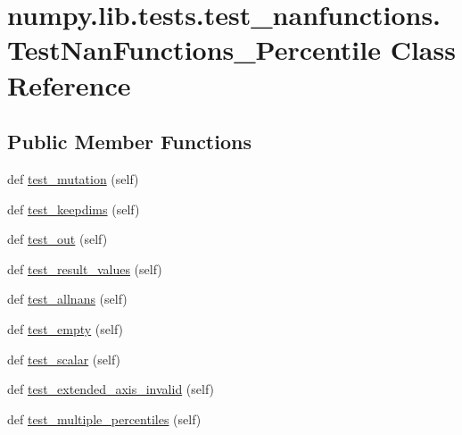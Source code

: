 \hypertarget{classnumpy_1_1lib_1_1tests_1_1test__nanfunctions_1_1TestNanFunctions__Percentile}{}\section{numpy.\+lib.\+tests.\+test\+\_\+nanfunctions.\+Test\+Nan\+Functions\+\_\+\+Percentile Class Reference}
\label{classnumpy_1_1lib_1_1tests_1_1test__nanfunctions_1_1TestNanFunctions__Percentile}
\subsection*{Public Member Functions}
\begin{DoxyCompactItemize}
\item 
def \hyperlink{classnumpy_1_1lib_1_1tests_1_1test__nanfunctions_1_1TestNanFunctions__Percentile_a850b78358728f6959a89c6f02c40cced}{test\+\_\+mutation} (self)
\item 
def \hyperlink{classnumpy_1_1lib_1_1tests_1_1test__nanfunctions_1_1TestNanFunctions__Percentile_ace4d917268c291b2cadeed8873438ccf}{test\+\_\+keepdims} (self)
\item 
def \hyperlink{classnumpy_1_1lib_1_1tests_1_1test__nanfunctions_1_1TestNanFunctions__Percentile_af4368457b93c0a5e3300e399301296ab}{test\+\_\+out} (self)
\item 
def \hyperlink{classnumpy_1_1lib_1_1tests_1_1test__nanfunctions_1_1TestNanFunctions__Percentile_acc7fbfbcca230180c96e1ce43a7ec4ad}{test\+\_\+result\+\_\+values} (self)
\item 
def \hyperlink{classnumpy_1_1lib_1_1tests_1_1test__nanfunctions_1_1TestNanFunctions__Percentile_a4122833efa062e41f3374945c762b11c}{test\+\_\+allnans} (self)
\item 
def \hyperlink{classnumpy_1_1lib_1_1tests_1_1test__nanfunctions_1_1TestNanFunctions__Percentile_a1795de0a5539d7c36bd90f37a66c07f6}{test\+\_\+empty} (self)
\item 
def \hyperlink{classnumpy_1_1lib_1_1tests_1_1test__nanfunctions_1_1TestNanFunctions__Percentile_a93adfe9b5406d085e583375671771318}{test\+\_\+scalar} (self)
\item 
def \hyperlink{classnumpy_1_1lib_1_1tests_1_1test__nanfunctions_1_1TestNanFunctions__Percentile_a8ec2cbcb5958483f8b22bfd79dd6bf6a}{test\+\_\+extended\+\_\+axis\+\_\+invalid} (self)
\item 
def \hyperlink{classnumpy_1_1lib_1_1tests_1_1test__nanfunctions_1_1TestNanFunctions__Percentile_a2fadeba00aebf65f3f385a63a9e822f9}{test\+\_\+multiple\+\_\+percentiles} (self)
\end{DoxyCompactItemize}


